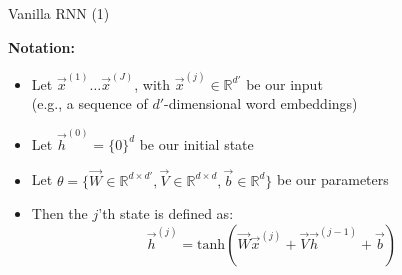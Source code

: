 \documentclass[11pt,compress,t,notes=noshow, xcolor=table]{beamer}
\begin{document}
\begin{vbframe}{Vanilla RNN (1)}

\vfill

\textbf{Notation:}

\begin{itemize}
	\item Let $\vec x^{(1)} \ldots \vec x^{(J)}$, with $\vec x^{(j)} \in \mathbb{R}^{d'}$ be our input\\
				(e.g., a sequence of $d'$-dimensional word embeddings)
	\item Let $\vec h^{(0)}  = \{0\}^{d}$ be our initial state
	\item Let $\theta = \{\vec W \in \mathbb{R}^{d \times d'}, \vec V \in \mathbb{R}^{d \times d}, \vec b \in \mathbb{R}^{d}\}$ be our parameters
	\item Then the $j$'th state is defined as:
	$$\vec h^{(j)} = \mathrm{tanh}(\vec W \vec x^{(j)}  + \vec V \vec h^{({j-1})} + \vec b)$$
\end{itemize}

\vfill

\end{vbframe}

\end{document}
